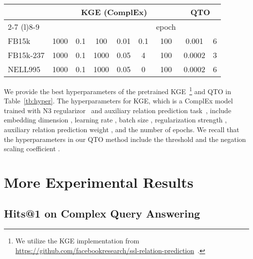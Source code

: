 \begin{table*}[!h]
\centering
\begin{tabular}{lcccccccc}
\toprule
 & \multicolumn{6}{c}{KGE (ComplEx)} & \multicolumn{2}{c}{QTO} \\
\cmidrule(l){2-7} \cmidrule(l){8-9}
&  &  &  &  &  & epoch &  &  \\
\midrule
FB15k & 1000 & 0.1 & 100 & 0.01 & 0.1 & 100 & 0.001 & 6 \\
FB15k-237 & 1000 & 0.1 & 1000 & 0.05 & 4 & 100 & 0.0002 & 3 \\
NELL995 & 1000 & 0.1 & 1000 & 0.05 & 0 & 100 & 0.0002 & 6 \\
\toprule
\end{tabular}
\caption{Hyperparameters of pretrained KGE and QTO.}
\label{tb:hyper}
\end{table*}

We provide the best hyperparameters of the pretrained KGE~\footnote{We utilize the KGE implementation from \href{https://github.com/facebookresearch/ssl-relation-prediction}{https://github.com/facebookresearch/ssl-relation-prediction}~\cite{chen2021relation}.} and QTO in Table~\ref{tb:hyper}.
The hyperparameters for KGE, which is a ComplEx model~\cite{trouillon2016complex} trained with N3 regularizor~\cite{lacroix2018canonical} and auxiliary relation prediction task~\cite{chen2021relation}, include embedding dimension , learning rate , batch size , regularization strength , auxiliary relation prediction weight , and the number of epochs.
We recall that the hyperparameters in our QTO method include the threshold  and the negation scaling coefficient .

\section{More Experimental Results}

\subsection{Hits@1 on Complex Query Answering}
\label{app:h@1}

